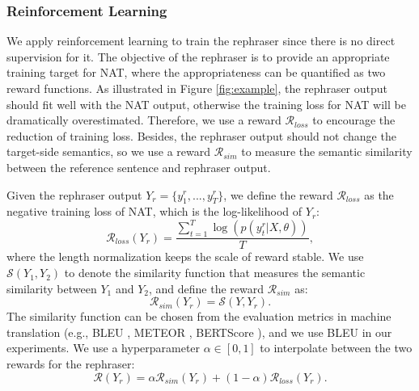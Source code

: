 \documentclass[letterpaper]{article} %
\begin{document}
\subsubsection{Reinforcement Learning}
We apply reinforcement learning to train the rephraser since there is no direct supervision for it. The objective of the rephraser is to provide an appropriate training target for NAT, where the appropriateness can be quantified as two reward functions. 
As illustrated in Figure \ref{fig:example}, the rephraser output should fit well with the NAT output, otherwise the training loss for NAT will be dramatically overestimated. Therefore, we use a reward $\mathcal{R}_{loss}$ to encourage the reduction of training loss. Besides, the rephraser output should not change the target-side semantics, so we use a reward $\mathcal{R}_{sim}$ to measure the semantic similarity between the reference sentence and rephraser output.

Given the rephraser output $Y_r=\{y_1^r,...,y_T^r\}$, we define the reward $\mathcal{R}_{loss}$ as the negative training loss of NAT, which is the log-likelihood of $Y_r$:
\begin{equation}
\mathcal{R}_{loss}(Y_r) = \frac{\sum_{t=1}^{T}\log(p(y_t^r|X,\theta))}{T},
\end{equation}
where the length normalization keeps the scale of reward stable. We use $\mathcal{S}(Y_1,Y_2)$ to denote the similarity function that measures the semantic similarity between $Y_1$ and $Y_2$, and define the reward $\mathcal{R}_{sim}$ as:
\begin{equation}
\mathcal{R}_{sim}(Y_r) = \mathcal{S}(Y,Y_r).
\end{equation}
The similarity function can be chosen from the evaluation metrics in machine translation (e.g., BLEU \cite{papineni2002bleu}, METEOR \cite{banerjee-lavie-2005-meteor}, BERTScore \cite{zhang2019bertscore}), and we use BLEU in our experiments. We use a hyperparameter $\alpha \in [0,1]$ to interpolate between the two rewards for the rephraser:
\begin{equation}
\label{eq:rsim}
\mathcal{R}(Y_r) = \alpha \mathcal{R}_{sim}(Y_r)+(1-\alpha)\mathcal{R}_{loss}(Y_r).
\end{equation}
\end{document}
